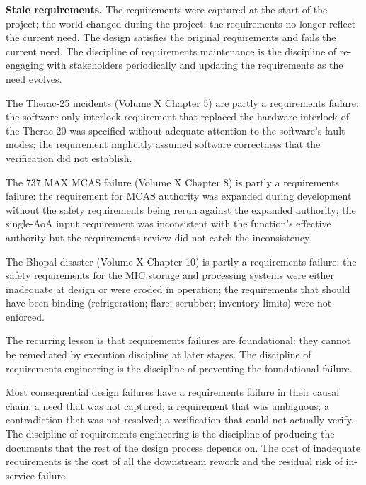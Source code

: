 \textbf{Stale requirements.} The requirements were captured at the start of the project; the world changed during the project; the requirements no longer reflect the current need. The design satisfies the original requirements and fails the current need. The discipline of requirements maintenance is the discipline of re-engaging with stakeholders periodically and updating the requirements as the need evolves.

The Therac-25 incidents (Volume X Chapter 5) are partly a requirements failure: the software-only interlock requirement that replaced the hardware interlock of the Therac-20 was specified without adequate attention to the software's fault modes; the requirement implicitly assumed software correctness that the verification did not establish.

The 737 MAX MCAS failure (Volume X Chapter 8) is partly a requirements failure: the requirement for MCAS authority was expanded during development without the safety requirements being rerun against the expanded authority; the single-AoA input requirement was inconsistent with the function's effective authority but the requirements review did not catch the inconsistency.

The Bhopal disaster (Volume X Chapter 10) is partly a requirements failure: the safety requirements for the MIC storage and processing systems were either inadequate at design or were eroded in operation; the requirements that should have been binding (refrigeration; flare; scrubber; inventory limits) were not enforced.

The recurring lesson is that requirements failures are foundational: they cannot be remediated by execution discipline at later stages. The discipline of requirements engineering is the discipline of preventing the foundational failure.

\begin{principle}
Most consequential design failures have a requirements failure in their causal chain: a need that was not captured; a requirement that was ambiguous; a contradiction that was not resolved; a verification that could not actually verify. The discipline of requirements engineering is the discipline of producing the documents that the rest of the design process depends on. The cost of inadequate requirements is the cost of all the downstream rework and the residual risk of in-service failure.
\end{principle}

